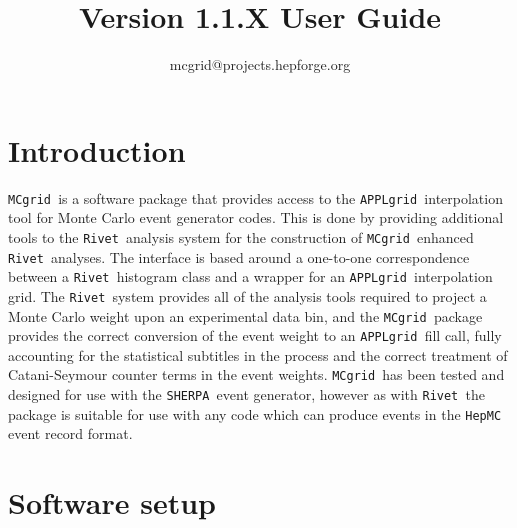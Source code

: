 \documentclass[11pt]{article}
\title{\mcgrid Version 1.1.X User Guide}
\author{mcgrid@projects.hepforge.org}
\newcommand{\mcgrid} {{\tt MCgrid }}
\newcommand{\rivet} {{\tt Rivet }}
\newcommand{\appl} {{\tt APPLgrid }}
\newcommand{\sherpa} {{\tt SHERPA }}
\begin{document}
\date{}
\maketitle
\tableofcontents
\section{Introduction}
\mcgrid is a software package that provides access to the \appl interpolation tool for Monte Carlo event generator codes. This is done by providing additional tools to the \rivet analysis system for the construction of \mcgrid enhanced \rivet analyses. The interface is based around a one-to-one correspondence between a \rivet histogram class and a wrapper for an \appl interpolation grid. The \rivet system provides all of the analysis tools required to project a Monte Carlo weight upon an experimental data bin, and the \mcgrid package provides the correct conversion of the event weight to an \appl fill call, fully accounting for the statistical subtitles in the process and the correct treatment of Catani-Seymour counter terms in the event weights. \mcgrid has been tested and designed for use with the \sherpa event generator, however as with \rivet the package is suitable for use with any code which can produce events in the {\tt HepMC} event record format.
\clearpage

\section{Software setup}
\end{document}
